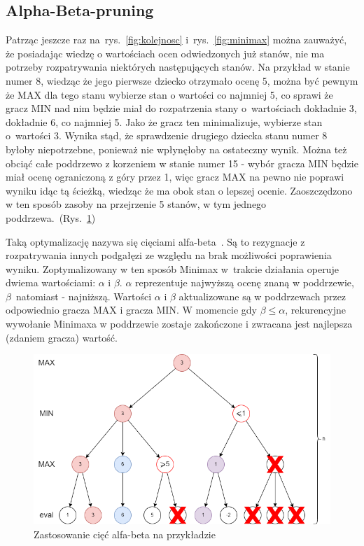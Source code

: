 \subsection{Alpha-Beta-pruning}

Patrząc jeszcze raz na~rys.~\ref{fig:kolejnosc} i~rys.~\ref{fig:minimax} można zauważyć, że posiadając wiedzę o wartościach ocen odwiedzonych już stanów, nie ma potrzeby rozpatrywania niektórych następujących stanów. Na przykład w stanie numer 8, wiedząc że jego pierwsze dziecko otrzymało ocenę 5, można być pewnym że MAX dla tego stanu wybierze stan o wartości co najmniej 5, co sprawi że gracz MIN nad nim będzie miał do rozpatrzenia stany o~wartościach dokładnie 3, dokładnie 6, co najmniej 5. Jako że gracz ten minimalizuje, wybierze stan o~wartości 3. Wynika stąd, że sprawdzenie drugiego dziecka stanu numer 8 byłoby niepotrzebne, ponieważ nie wpłynęłoby na ostateczny wynik. Można też obciąć całe poddrzewo z korzeniem w stanie numer 15 - wybór gracza MIN będzie miał ocenę ograniczoną z góry przez 1, więc gracz MAX na pewno nie poprawi wyniku idąc tą ścieżką, wiedząc że ma obok stan o lepszej ocenie. Zaoszczędzono w ten sposób zasoby na przejrzenie 5 stanów, w tym jednego poddrzewa.~(Rys.~\ref{fig:alpha_beta})

Taką optymalizację nazywa się cięciami alfa-beta~\cite{Modern}. Są to rezygnacje z rozpatrywania innych podgałęzi ze względu na brak możliwości poprawienia wyniku. Zoptymalizowany w ten sposób Minimax w~trakcie działania operuje dwiema wartościami: $\alpha$ i $\beta$. $\alpha$ reprezentuje najwyższą ocenę znaną w poddrzewie, $\beta$~natomiast - najniższą. Wartości $\alpha$ i $\beta$ aktualizowane są w poddrzewach przez odpowiednio gracza MAX i gracza MIN. W momencie gdy $\beta \leq \alpha$, rekurencyjne wywołanie Minimaxa w poddrzewie zostaje zakończone i zwracana jest najlepsza (zdaniem gracza) wartość.

\begin{figure}
    \centering
    \includegraphics[scale=.6]{graphics/minimax_alfa-beta.png}
    \caption{Zastosowanie cięć alfa-beta na przykładzie}
    \label{fig:alpha_beta}
\end{figure}

